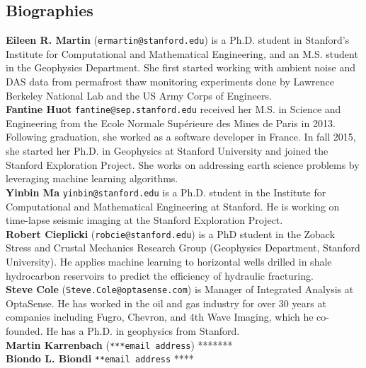 \documentclass[11pt]{article}
\begin{document}
\subsection*{Biographies}
\vspace{-0.2cm}
\textbf{Eileen R. Martin} (\texttt{ermartin@stanford.edu}) is a Ph.D. student in Stanford's Institute for Computational and Mathematical Engineering, and an M.S. student in the Geophysics Department. She first started working with ambient noise and DAS data from permafrost thaw monitoring experiments done by Lawrence Berkeley National Lab and the US Army Corps of Engineers.
\\
\textbf{Fantine Huot} \texttt{fantine@sep.stanford.edu} received her M.S. in Science and Engineering from the Ecole Normale Sup\'erieure des Mines de Paris in 2013. Following graduation, she worked as a software developer in France. In fall 2015, she started her Ph.D. in Geophysics at Stanford University and joined the Stanford Exploration Project. She works on addressing earth science problems by leveraging machine learning algorithms.
\\
\textbf{Yinbin Ma} \texttt{yinbin@stanford.edu} is a Ph.D. student in the Institute for Computational and Mathematical Engineering at Stanford. He is working on time-lapse seismic imaging at the Stanford Exploration Project.
\\
\textbf{Robert Cieplicki} (\texttt{robcie@stanford.edu}) is a PhD student in the Zoback Stress and Crustal Mechanics Research Group (Geophysics Department, Stanford University). He applies machine learning to horizontal wells drilled in shale hydrocarbon reservoirs to predict the efficiency of hydraulic fracturing.
\\
\textbf{Steve Cole} (\texttt{Steve.Cole@optasense.com}) is Manager of Integrated Analysis at OptaSense. He has worked in the oil and gas industry for over 30 years at companies including Fugro, Chevron, and 4th Wave Imaging, which he co-founded. He has a Ph.D. in geophysics from Stanford.
\\
\textbf{Martin Karrenbach} (\texttt{***email address}) *******
\\
\textbf{Biondo L. Biondi} \texttt{**email address} ****
\end{document}
